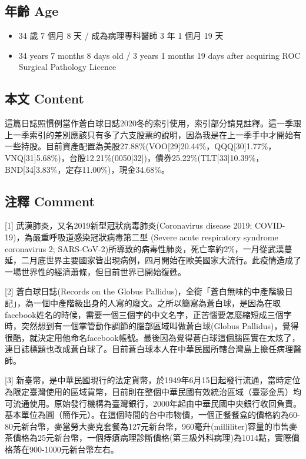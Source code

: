 \documentclass[a5paper, 11pt
]{book}
\providecommand{\tightlist}{%
  \setlength{\itemsep}{0pt}\setlength{\parskip}{0pt}}
\begin{document}
\hypertarget{ux5e74ux9f61-age}{%
\subsection{年齡 Age}\label{ux5e74ux9f61-age}}

\begin{itemize}
\tightlist
\item
  34 歲 7 個月 8 天 / 成為病理專科醫師 3 年 1 個月 19 天
\item
  34 years 7 months 8 days old / 3 years 1 months 19 days after
  acquiring ROC Surgical Pathology Licence
\end{itemize}

\hypertarget{ux672cux6587-content}{%
\subsection{本文 Content}\label{ux672cux6587-content}}

這篇日誌照慣例當作蒼白球日誌2020冬的索引使用，索引部分請見註釋。這一季跟上一季索引的差別應該只有多了六支股票的說明，因為我是在上一季手中才開始有一些持股。目前資產配置為美股27.88\%(VOO{[}29{]}20.44\%，QQQ{[}30{]}1.77\%，VNQ{[}31{]}5.68\%)，台股12.21\%(0050{[}32{]})，債券25.22\%(TLT{[}33{]}10.39\%，BND{[}34{]}3.83\%，定存11.00\%)，現金34.68\%。

\hypertarget{ux6ce8ux91cb-comment}{%
\subsection{注釋 Comment}\label{ux6ce8ux91cb-comment}}

{[}1{]} 武漢肺炎，又名2019新型冠狀病毒肺炎(Coronavirus disease 2019;
COVID-19)，為嚴重呼吸道感染冠狀病毒第二型 (Severe acute respiratory
syndrome coronavirus 2;
SARS-CoV-2)所導致的病毒性肺炎，死亡率約2\%，一月從武漢蔓延，二月底世界主要國家皆出現病例，四月開始在歐美國家大流行。此疫情造成了一場世界性的經濟蕭條，但目前世界已開始復甦。

{[}2{]} 蒼白球日誌(Records on the Globus
Pallidus)，全銜「蒼白無味的中產階級日記」，為一個中產階級出身的人寫的廢文。之所以簡寫為蒼白球，是因為在取facebook姓名的時候，需要一個三個字的中文名字，正苦惱要怎麼縮短成三個字時，突然想到有一個掌管動作調節的腦部區域叫做蒼白球(Globus
Pallidus)，覺得很酷，就決定用他命名facebook帳號。最後因為覺得蒼白球這個腦區實在太炫了，連日誌標題也改成蒼白球了。目前蒼白球本人在中華民國所轄台灣島上擔任病理醫師。

{[}3{]}
新臺幣，是中華民國現行的法定貨幣，於1949年6月15日起發行流通，當時定位為限定臺灣使用的區域貨幣，目前則在整個中華民國有效統治區域（臺澎金馬）均可流通使用。原始發行機構為臺灣銀行，2000年起由中華民國中央銀行收回負責。基本單位為圓（簡作元）。在這個時間的台中市物價，一個正餐餐盒的價格約為60-80元新台幣，麥當勞大麥克套餐為127元新台幣，960毫升(milliliter)容量的市售麥茶價格為25元新台幣，一個痔瘡病理診斷價格(第三級外科病理)為1014點，實際價格落在900-1000元新台幣左右。
\end{document}
